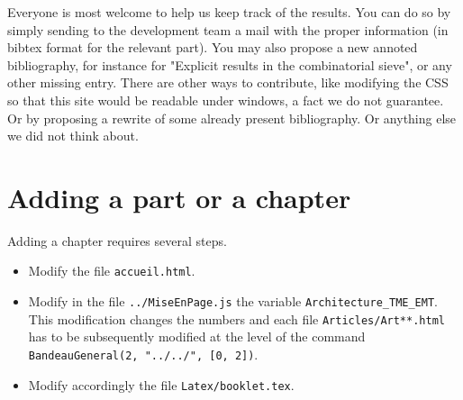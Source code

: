 \documentclass[10pt,twoside, svgnames]{book}
\begin{document}
Everyone is most welcome to help us keep track of the results. You can
do so by simply sending to the development team a mail with the proper
information (in bibtex format for the relevant part).  You may also
propose a new annoted bibliography, for instance for "Explicit results
in the combinatorial sieve", or any other missing entry.  There are
other ways to contribute, like modifying the CSS so that this site
would be readable under windows, a fact we do not guarantee. Or by
proposing a rewrite of some already present bibliography. Or anything
else we did not think about.


\section{Adding a part or a chapter}

Adding a chapter requires several steps.
\begin{itemize}
\item Modify the file \texttt{accueil.html}.
\item Modify in the file \texttt{../MiseEnPage.js} the variable
  \texttt{Architecture\_TME\_EMT}.
  This modification changes the numbers and each file
  \texttt{Articles/Art**.html} has to be subsequently modified at the
  level of the command \texttt{BandeauGeneral(2, "../../", [0, 2])}.
\item Modify accordingly the file \texttt{Latex/booklet.tex}.
\end{itemize}




\backmatter

\printbibliography[heading=bibintoc]
\end{document}
